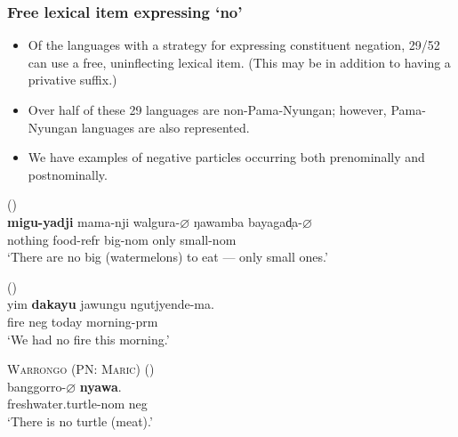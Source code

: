 \documentclass{article}
\begin{document}
\subsubsection{Free lexical item expressing `no'}

\begin{itemize}
    \item Of the languages with a strategy for expressing constituent negation, 29/52 can use a free, uninflecting lexical item. (This may be in addition to having a privative suffix.)
    \item Over half of these 29 languages are non-Pama-Nyungan; however, Pama-Nyungan languages are also represented.
    \item We have examples of negative particles occurring both prenominally and postnominally.
\end{itemize}

\begin{exe}
 (\citealt[37]{furby77}) \\
\gll \textbf{migu-yadji}    mama-nji    walgura-$\varnothing$    ŋawamba    bayagad̩a-$\varnothing$ \\
    nothing    food-{\sc refr}    big-{\sc nom}    only        small-{\sc nom} \\
    \glt `There are no big (watermelons) to eat --- only small ones.'

 (\citealt[102]{zandvoort99})\\
\gll yim \textbf{dakayu} jawungu ngutjyende-ma.\\
fire {\sc neg} today morning-{\sc prm}\\
\glt `We had no fire this morning.' %
    
\ex \textsc{Warrongo (PN: Maric)} (\citealt[660]{tsunoda11})\\
\gll banggorro-$\varnothing$ \textbf{nyawa}.\\
freshwater.turtle-{\sc nom} {\sc neg}\\
\glt `There is no turtle (meat).' 
\end{exe}
\end{document}
